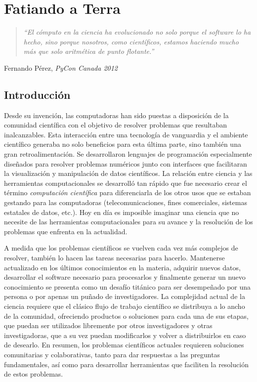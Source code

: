 \chapter{Fatiando a Terra}

\begin{quotation}
    \textit{%
    ``El cómputo en la ciencia ha evolucionado no solo porque el software lo ha
    hecho, sino porque nosotros, como científicos, estamos haciendo mucho más
    que solo aritmética de punto flotante.''
    }
\end{quotation}
\begin{flushright}
Fernando Pérez, \textit{PyCon Canada 2012}
\end{flushright}

\section{Introducción}

Desde su invención, las computadoras han sido puestas a disposición de la
comunidad científica con el objetivo de resolver problemas que resultaban
inalcanzables.
Esta interacción entre una tecnología de vanguardia y el ambiente científico
generaba no solo beneficios para esta última parte, sino también una gran
retroalimentación.
Se desarrollaron lenguajes de programación especialmente diseñados para
resolver problemas numéricos junto con interfaces que facilitaran la
visualización y manipulación de datos científicos.
La relación entre ciencia y las herramientas computacionales se desarrolló tan
rápido que fue necesario crear el término \emph{computación científica} para
diferenciarla de los otros usos que se estaban gestando para las computadoras
(telecomunicaciones, fines comerciales, sistemas estatales de datos, etc.).
Hoy en día es imposible imaginar una ciencia que no necesite de las
herramientas computacionales para su avance y la resolución de los problemas
que enfrenta en la actualidad.

A medida que los problemas científicos se vuelven cada vez más complejos de
resolver,
también lo hacen las tareas necesarias para hacerlo.
Mantenerse actualizado en los últimos conocimientos en la materia, adquirir
nuevos datos, desarrollar el software necesario para procesarlos y finalmente
generar un nuevo conocimiento se presenta como un desafío titánico para ser
desempeñado por una persona o por apenas un puñado de investigadores.
La complejidad actual de la ciencia requiere que el clásico flujo de trabajo
científico se distribuya a lo ancho de la comunidad, ofreciendo productos
o soluciones para cada una de sus etapas, que puedan ser utilizados libremente
por otros investigadores y otras investigadoras, que a su vez puedan
modificarlos y volver a distribuirlos en caso de desearlo.
En resumen, los problemas científicos actuales requieren soluciones
comunitarias y colaborativas, tanto para dar respuestas a las preguntas
fundamentales, así como para desarrollar herramientas que faciliten la
resolución de estos problemas.

